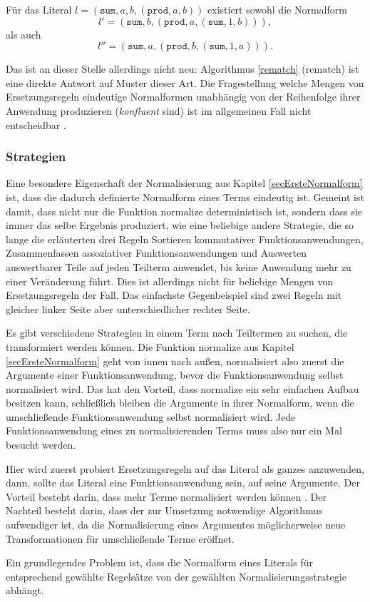 Für das Literal $l = (\texttt{sum}, a, b, (\texttt{prod}, a, b))$ existiert sowohl die Normalform 
$$l' = (\texttt{sum}, b, (\texttt{prod}, a, (\texttt{sum}, 1, b))),$$ 
als auch 
$$l'' = (\texttt{sum}, a, (\texttt{prod}, b, (\texttt{sum}, 1, a))).$$

Das ist an dieser Stelle allerdings nicht neu: Algorithmus \ref{rematch} ($\mathrm{rematch}$) ist eine direkte Antwort auf Muster dieser Art. Die Fragestellung welche Mengen von Ersetzungsregeln eindeutige Normalformen unabhängig von der Reihenfolge ihrer Anwendung produzieren (\emph{konfluent} sind) ist im allgemeinen Fall nicht entscheidbar \cite{KonfluenzUnentscheidbar}.



\subsubsection{Strategien}
Eine besondere Eigenschaft der Normalisierung aus Kapitel \ref{secErsteNormalform} ist, dass die dadurch definierte Normalform eines Terms eindeutig ist. Gemeint ist damit, dass nicht nur die Funktion $\mathrm{normalize}$ deterministisch ist, sondern dass sie immer das selbe Ergebnis produziert, wie eine beliebige andere Strategie, die so lange die erläuterten drei Regeln Sortieren kommutativer Funktionsanwendungen, Zusammenfassen assoziativer Funktionsanwendungen und Auswerten auswertbarer Teile auf jeden Teilterm anwendet, bis keine Anwendung mehr zu einer Veränderung führt. Dies ist allerdings nicht für beliebige Mengen von Ersetzungsregeln der Fall. Das einfachste Gegenbeispiel sind zwei Regeln mit gleicher linker Seite aber unterschiedlicher rechter Seite.




Es gibt verschiedene Strategien in einem Term nach Teiltermen zu suchen, die transformiert werden können. Die Funktion $\mathrm{normalize}$ aus Kapitel \ref{secErsteNormalform} geht von innen nach außen, normalisiert also zuerst die Argumente einer Funktionsanwendung, bevor die Funktionsanwendung selbst normalisiert wird. Das hat den Vorteil, dass $\mathrm{normalize}$ ein sehr einfachen Aufbau besitzen kann, schließlich bleiben die Argumente in ihrer Normalform, wenn die umschließende Funktionsanwendung selbst normalisiert wird. Jede Funktionsanwendung eines zu normalisierenden Terms muss also nur ein Mal besucht werden.


Hier wird zuerst probiert Ersetzungsregeln auf das Literal als ganzes anzuwenden, dann, sollte das Literal eine Funktionsanwendung sein, auf seine Argumente. Der Vorteil besteht darin, dass mehr Terme normalisiert werden können \cite{EvalStrategien}. Der Nachteil besteht darin, dass der zur Umsetzung notwendige Algorithmus aufwendiger ist, da die Normalisierung eines Argumentes möglicherweise neue Transformationen für umschließende Terme eröffnet.

Ein grundlegendes Problem ist, dass die Normalform eines Literals für entsprechend gewählte Regelsätze von der gewählten Normalisierungsstrategie abhängt. 


















